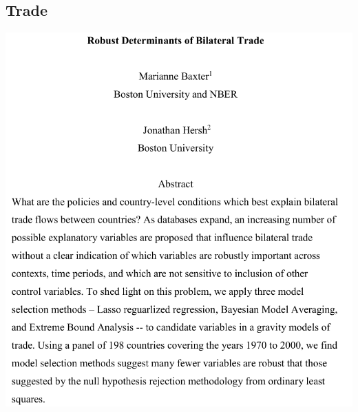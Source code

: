 \subsection{Trade}
\begin{frame}
    \vspace{-10pt}
    \begin{center}
    \includegraphics[height=\textheight]{./resources/BaxterAbstract}
    \end{center}
    \nocite{baxter2017robust}
\end{frame}

